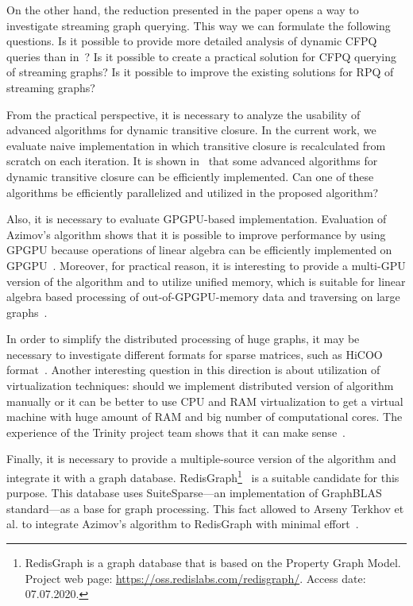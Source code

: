 On the other hand, the reduction presented in the paper opens a way to investigate streaming graph querying.
This way we can formulate the following questions. Is it possible to provide more detailed analysis of dynamic CFPQ queries than in~\cite{10.1007/978-3-662-54458-7_16}? Is it possible to create a practical solution for CFPQ querying of streaming graphs? Is it possible to improve the existing solutions for RPQ of streaming graphs?

From the practical perspective, it is necessary to analyze the usability of advanced algorithms for dynamic transitive closure.
In the current work, we evaluate naive implementation in which transitive closure is recalculated from scratch on each iteration.
It is shown in~\cite{cs6345} that some advanced algorithms for dynamic transitive closure can be efficiently implemented.
Can one of these algorithms be efficiently parallelized and utilized in the proposed algorithm?

Also, it is necessary to evaluate GPGPU-based implementation.
Evaluation of Azimov's algorithm shows that it is possible to improve performance by using GPGPU because operations of linear algebra can be efficiently implemented on GPGPU~\cite{Mishin:2019:ECP:3327964.3328503,10.1145/3398682.3399163}.
Moreover, for practical reason, it is interesting to provide a multi-GPU version of the algorithm and to utilize unified memory, which is suitable for linear algebra based processing of out-of-GPGPU-memory data and traversing on large graphs~\cite{8946118,10.14778/3384345.3384358}.

In order to simplify the distributed processing of huge graphs, it may be necessary to investigate different formats for sparse matrices, such as HiCOO format~\cite{10.5555/3291656.3291682}.
Another interesting question in this direction is about utilization of virtualization techniques: should we implement distributed version of algorithm manually or it can be better to use CPU and RAM virtualization to get a virtual machine with huge amount of RAM and big number of computational cores.
The experience of the Trinity project team shows that it can make sense~\cite{10.1145/2463676.2467799}.

Finally, it is necessary to provide a multiple-source version of the algorithm and integrate it with a graph database.
RedisGraph\footnote{RedisGraph is a graph database that is based on the Property Graph
Model. Project web page: \url{https://oss.redislabs.com/redisgraph/}. Access date:
07.07.2020.}~\cite{8778293} is a suitable candidate for this purpose.
This database uses SuiteSparse---an implementation of GraphBLAS standard---as a base for graph processing.
This fact allowed to Arseny Terkhov et al.  to integrate Azimov's algorithm to RedisGraph with minimal effort~\cite{10.1145/3398682.3399163}.
